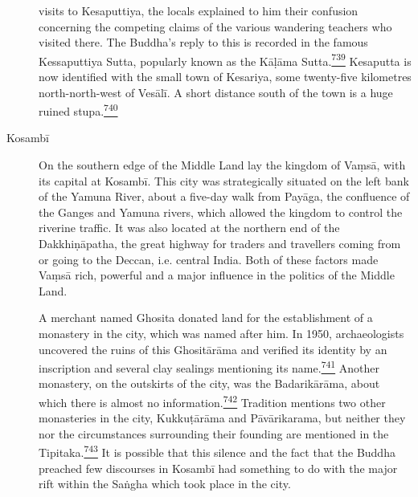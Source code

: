 \begin{description}
visits to Kesaputtiya, the locals explained to him their confusion
concerning the competing claims of the various wandering teachers who
visited there. The Buddha's reply to this is recorded in the famous
Kessaputtiya Sutta, popularly known as the Kāḷāma
Sutta.\label{footprints_split_019.html_fnref739}\hyperref[footprints_split_025.htmlux5cux23fn739]{\textsuperscript{739}}
Kesaputta is now identified with the small town of Kesariya, some
twenty-five kilometres north-north-west of Vesālī. A short distance
south of the town is a huge ruined
stupa.\label{footprints_split_019.html_fnref740}\hyperref[footprints_split_025.htmlux5cux23fn740]{\textsuperscript{740}}
\item[Kosambī]
On the southern edge of the Middle Land lay the kingdom of Vaṃsā, with
its capital at Kosambī. This city was strategically situated on the left
bank of the Yamuna River, about a five-day walk from Payāga, the
confluence of the Ganges and Yamuna rivers, which allowed the kingdom to
control the riverine traffic. It was also located at the northern end of
the Dakkhiṇāpatha, the great highway for traders and travellers coming
from or going to the Deccan, i.e. central India. Both of these factors
made Vaṃsā rich, powerful and a major influence in the politics of the
Middle Land.

A merchant named Ghosita donated land for the establishment of a
monastery in the city, which was named after him. In 1950,
archaeologists uncovered the ruins of this Ghositārāma and verified its
identity by an inscription and several clay sealings mentioning its
name.\label{footprints_split_019.html_fnref741}\hyperref[footprints_split_025.htmlux5cux23fn741]{\textsuperscript{741}}
Another monastery, on the outskirts of the city, was the Badarikārāma,
about which there is almost no
information.\label{footprints_split_019.html_fnref742}\hyperref[footprints_split_025.htmlux5cux23fn742]{\textsuperscript{742}}
Tradition mentions two other monasteries in the city, Kukkuṭārāma and
Pāvārikarama, but neither they nor the circumstances surrounding their
founding are mentioned in the
Tipitaka.\label{footprints_split_019.html_fnref743}\hyperref[footprints_split_025.htmlux5cux23fn743]{\textsuperscript{743}}
It is possible that this silence and the fact that the Buddha preached
few discourses in Kosambī had something to do with the major rift within
the Saṅgha which took place in the city.


\end{description}
